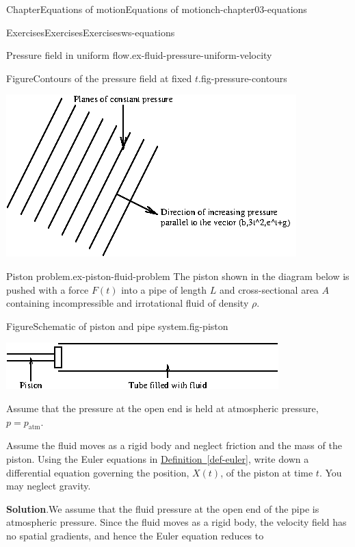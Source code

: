 \documentclass[oneside,10pt,]{book}
\newcommand{\blocktitlefont}{\relax}
\newcommand{\xreffont}{\relax}
\numberwithin{equation}{section}
\begin{document}
\begin{chapterptx}{Chapter}{Equations of motion}{}{Equations of motion}{}{}{ch-chapter03-equations}
\begin{exercises-section}{Exercises}{Exercises}{}{Exercises}{}{}{ws-equations}
\begin{divisionexercise}{5}{Pressure field in uniform flow.}{}{ex-fluid-pressure-uniform-velocity}
\begin{enumerate}[font=\bfseries,label=(\alph*),ref=\alph*]
\begin{figureptx}{Figure}{Contours of the pressure field at fixed \(t\).}{fig-pressure-contours}{}
\begin{image}{0}{1}{0}{}
\includegraphics[width=\linewidth]{external/ch-chapter03-pressure-contours.png}
\end{image}%
\tcblower
\end{figureptx}%
\end{enumerate}%
\end{divisionexercise}%
\begin{divisionexercise}{6}{Piston problem.}{}{ex-piston-fluid-problem}%
The piston shown in the diagram below is pushed with a force \(F(t)\) into a pipe of length \(L\) and cross-sectional area \(A\) containing incompressible and irrotational fluid of density \(\rho\).%
\begin{figureptx}{Figure}{Schematic of piston and pipe system.}{fig-piston}{}%
\begin{image}{0}{1}{0}{}%
\includegraphics[width=\linewidth]{external/ch-chapter03-piston.png}
\end{image}%
\tcblower
\end{figureptx}%
Assume that the pressure at the open end is held at atmospheric pressure, \(p = p_\text{atm}\).%
\par
Assume the fluid moves as a rigid body and neglect friction and the mass of the piston. Using the Euler equations in \hyperref[def-euler]{Definition~{\xreffont\ref{def-euler}}}, write down a differential equation governing the position, \(X(t)\), of the piston at time \(t\). You may neglect gravity.%
\par\smallskip%
\noindent\textbf{\blocktitlefont Solution}.\hypertarget{ex-piston-fluid-problem-3}{}\quad{}We assume that the fluid pressure at the open end of the pipe is atmospheric pressure. Since the fluid moves as a rigid body, the velocity field has no spatial gradients, and hence the Euler equation reduces to%

\end{divisionexercise}
\end{exercises-section}
\end{chapterptx}
\end{document}
